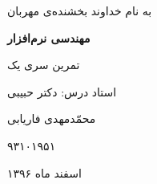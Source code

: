 \begin{center}
\large
به نام خداوند بخشنده‌ی مهربان

\Huge
\vspace*{4cm}
\textbf{مهندسی نرم‌افزار}

\vspace*{1cm}
\large
تمرین سری یک
\vspace*{3cm}

\Large
استاد درس: دکتر حبیبی
\vspace*{2cm}

\vspace*{1cm}

 محمّدمهدی فاریابی
 
۹۳۱۰۱۹۵۱
\vspace*{3cm}
\large

اسفند ماه ۱۳۹۶
\vspace*{5cm}

\end{center}
\newpage


